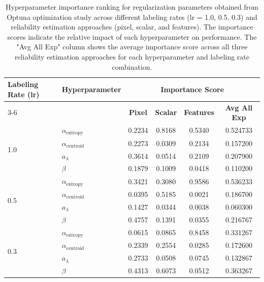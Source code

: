 \begin{table}[h]
  \centering
  \begin{tabular}{llcccc}
    \toprule
    \multirow{2}{*}{\textbf{Labeling Rate (lr)}} &
    \multirow{2}{*}{\textbf{Hyperparameter}} &
    \multicolumn{4}{c}{\textbf{Importance Score}} \\
    \cmidrule(lr){3-6}
    & & \textbf{Pixel} & \textbf{Scalar} & \textbf{Features} &
    \textbf{Avg All Exp} \\
    \midrule
    \multirow{4}{*}{1.0}
    & $\alpha_{\text{entropy}}$           & 0.2234 & 0.8168 & 0.5340
    & 0.524733 \\
    & $\alpha_{\text{centroid}}$          & 0.2273 & 0.0309 & 0.2134
    & 0.157200 \\
    & $a_{\lambda}$                       & 0.3614 & 0.0514 & 0.2109
    & 0.207900 \\
    & $\beta$                             & 0.1879 & 0.1009 & 0.0418
    & 0.110200 \\
    \midrule
    \multirow{4}{*}{0.5}
    & $\alpha_{\text{entropy}}$           & 0.3421 & 0.3080 & 0.9586
    & 0.536233 \\
    & $\alpha_{\text{centroid}}$          & 0.0395 & 0.5185 & 0.0021
    & 0.186700 \\
    & $a_{\lambda}$                       & 0.1427 & 0.0344 & 0.0038
    & 0.060300 \\
    & $\beta$                             & 0.4757 & 0.1391 & 0.0355
    & 0.216767 \\
    \midrule
    \multirow{4}{*}{0.3}
    & $\alpha_{\text{entropy}}$           & 0.0615 & 0.0865 & 0.8458
    & 0.331267 \\
    & $\alpha_{\text{centroid}}$          & 0.2339 & 0.2554 & 0.0285
    & 0.172600 \\
    & $a_{\lambda}$                       & 0.2733 & 0.0508 & 0.0745
    & 0.132867 \\
    & $\beta$                             & 0.4313 & 0.6073 & 0.0512
    & 0.363267 \\
    \bottomrule
  \end{tabular}
  \caption{Hyperparameter importance ranking for regularization parameters
    obtained from Optuna optimization study across different labeling rates
    (lr = 1.0, 0.5, 0.3) and reliability estimation approaches (pixel, scalar,
    and features). The importance scores indicate the relative impact of each
    hyperparameter on performance. The "Avg All Exp" column shows the average
    importance score across all three reliability estimation approaches for each
  hyperparameter and labeling rate combination.}
  \label{tab:hyperparameter_importance_regularizers}
\end{table}

